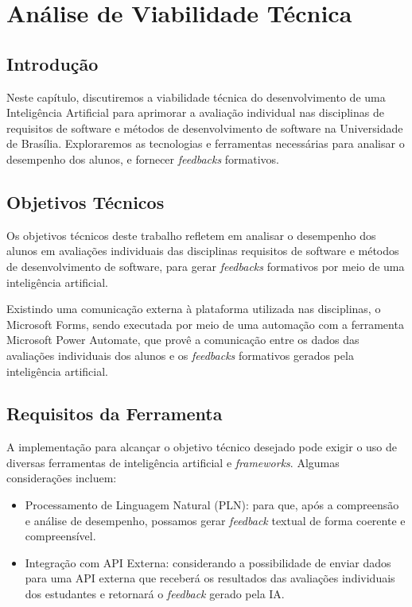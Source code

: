 \chapter{Análise de Viabilidade Técnica}

\section{Introdução}

Neste capítulo, discutiremos a viabilidade técnica do desenvolvimento de uma Inteligência Artificial para aprimorar a avaliação individual nas disciplinas de requisitos de software e métodos de desenvolvimento de software na Universidade de Brasília. Exploraremos as tecnologias e ferramentas necessárias para analisar o desempenho dos alunos, e fornecer \textit{feedbacks} formativos.

\section{Objetivos Técnicos}

Os objetivos técnicos deste trabalho refletem em analisar o desempenho dos alunos em avaliações individuais das disciplinas requisitos de software e métodos de desenvolvimento de software, para gerar \textit{feedbacks} formativos por meio de uma inteligência artificial.

Existindo uma comunicação externa à plataforma utilizada nas disciplinas, o Microsoft Forms, sendo executada por meio de uma automação com a ferramenta Microsoft Power Automate, que provê a comunicação entre os dados das avaliações individuais dos alunos e os \textit{feedbacks} formativos gerados pela inteligência artificial.

\section{Requisitos da Ferramenta}

A implementação para alcançar o objetivo técnico desejado pode exigir o uso de diversas ferramentas de inteligência artificial e \textit{frameworks}. Algumas considerações incluem:

\begin{itemize}
  \item Processamento de Linguagem Natural (PLN): para que, após a compreensão e análise de desempenho, possamos gerar \textit{feedback} textual de forma coerente e compreensível.
  \item Integração com API Externa: considerando a possibilidade de enviar dados para uma API externa que receberá os resultados das avaliações individuais dos estudantes e retornará o \textit{feedback} gerado pela IA.
\end{itemize}

